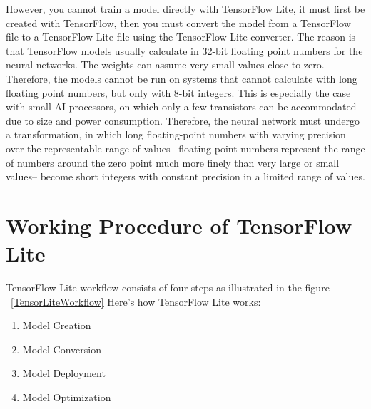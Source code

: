 However, you cannot train a model directly with TensorFlow Lite, it must first be created with TensorFlow, then you must convert the model from a TensorFlow file to a TensorFlow Lite file using the TensorFlow Lite converter. The reason is that TensorFlow models usually calculate in 32-bit floating point numbers for the neural networks. The weights can assume very small values close to zero. Therefore, the models cannot be run on systems that cannot calculate with long floating point numbers, but only with 8-bit integers. This is especially the case with small AI processors, on which only a few transistors can be accommodated due to size and power consumption. Therefore, the neural network must undergo a transformation, in which long floating-point numbers with varying precision over the representable range of values– floating-point numbers represent the range of numbers around the zero point much more finely than very large or small values– become short integers with constant precision in a limited range of values. \cite{CoralAI:2024}


\section{Working Procedure of TensorFlow Lite}

TensorFlow Lite workflow consists of four steps as illustrated in the figure ~\ref{TensorLiteWorkflow} Here’s how TensorFlow Lite works:  \cite{TensorFlowLite:2024}

\begin{enumerate}
	\item Model Creation
	\item Model Conversion
	\item Model Deployment
	\item Model Optimization
\end{enumerate}


